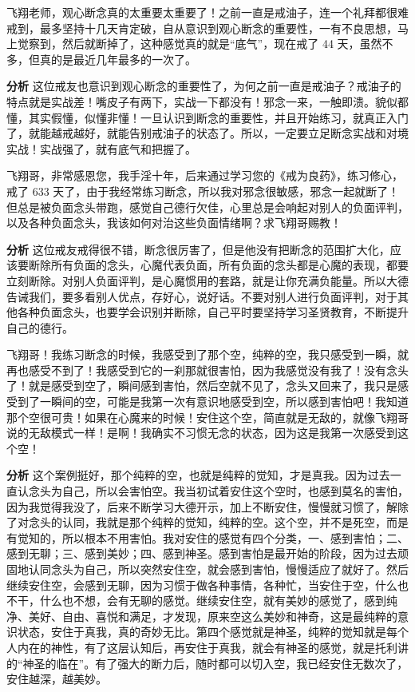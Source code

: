 \begin{case}
    飞翔老师，观心断念真的太重要太重要了！之前一直是戒油子，连一个礼拜都很难戒到，最多坚持十几天肯定破，自从意识到观心断念的重要性，一有不良思想，马上觉察到，然后就断掉了，这种感觉真的就是“底气”，现在戒了 44 天，虽然不多，但真的是最近几年最多的一次了。

    \textbf{分析} 这位戒友也意识到观心断念的重要性了，为何之前一直是戒油子？戒油子的特点就是实战差！嘴皮子有两下，实战一下都没有！邪念一来，一触即溃。貌似都懂，其实假懂，似懂非懂！一旦认识到断念的重要性，并且开始练习，就真正入门了，就能越戒越好，就能告别戒油子的状态了。所以，一定要立足断念实战和对境实战！实战强了，就有底气和把握了。
\end{case}

\begin{case}
    飞翔哥，非常感恩您，我手淫十年，后来通过学习您的《戒为良药》，练习修心，戒了 633 天了，由于我经常练习断念，所以我对邪念很敏感，邪念一起就断了！但总是被负面念头带跑，感觉自己德行欠佳，心里总是会响起对别人的负面评判，以及各种负面念头，我该如何对治这些负面情绪啊？求飞翔哥赐教！

    \textbf{分析} 这位戒友戒得很不错，断念很厉害了，但是他没有把断念的范围扩大化，应该要断除所有负面的念头，心魔代表负面，所有负面的念头都是心魔的表现，都要立刻断除。对别人负面评判，是心魔惯用的套路，就是让你充满负能量。所以大德告诫我们，要多看别人优点，存好心，说好话。不要对别人进行负面评判，对于其他各种负面念头，也要学会识别并断除，自己平时要坚持学习圣贤教育，不断提升自己的德行。
\end{case}

\begin{case}
    飞翔哥！我练习断念的时候，我感受到了那个空，纯粹的空，我只感受到一瞬，就再也感受不到了！我感受到它的一刹那就很害怕，因为我感觉没有我了！没有念头了！就是感受到空了，瞬间感到害怕，然后空就不见了，念头又回来了，我只是感受到了一瞬间的空，可能是我第一次有意识地感受到空，所以感到害怕吧！我知道那个空很可贵！如果在心魔来的时候！安住这个空，简直就是无敌的，就像飞翔哥说的无敌模式一样！是啊！我确实不习惯无念的状态，因为这是我第一次感受到这个空！

    \textbf{分析} 这个案例挺好，那个纯粹的空，也就是纯粹的觉知，才是真我。因为过去一直认念头为自己，所以会害怕空。我当初试着安住这个空时，也感到莫名的害怕，因为我觉得我没了，后来不断学习大德开示，加上不断安住，慢慢就习惯了，解除了对念头的认同，我就是那个纯粹的觉知，纯粹的空。这个空，并不是死空，而是有觉知的，所以根本不用害怕。我对安住的感觉有四个分类，一、感到害怕；二、感到无聊；三、感到美妙；四、感到神圣。感到害怕是最开始的阶段，因为过去顽固地认同念头为自己，所以突然安住空，就会感到害怕，慢慢适应了就好了。然后继续安住空，会感到无聊，因为习惯于做各种事情，各种忙，当安住于空，什么也不干，什么也不想，会有无聊的感觉。继续安住空，就有美妙的感觉了，感到纯净、美好、自由、喜悦和满足，才发现，原来空这么美妙和神奇，这是最纯粹的意识状态，安住于真我，真的奇妙无比。第四个感觉就是神圣，纯粹的觉知就是每个人内在的神性，有了这层认知后，再安住于真我，就会有神圣的感觉，就是托利讲的“神圣的临在”。有了强大的断力后，随时都可以切入空，我已经安住无数次了，安住越深，越美妙。
\end{case}

